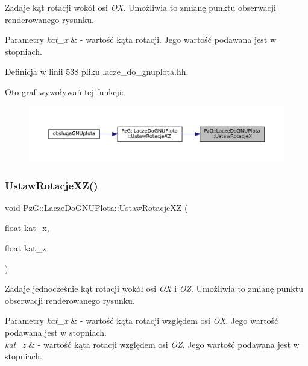 Zadaje kąt rotacji wokół osi {\itshape OX}. Umożliwia to zmianę punktu obserwacji renderowanego rysunku. 
\begin{DoxyParams}{Parametry}
{\em kat\+\_\+x} & -\/ wartość kąta rotacji. Jego wartość podawana jest w stopniach. \\
\hline
\end{DoxyParams}


Definicja w linii 538 pliku lacze\+\_\+do\+\_\+gnuplota.\+hh.

Oto graf wywoływań tej funkcji\+:\nopagebreak
\begin{figure}[H]
\begin{center}
\leavevmode
\includegraphics[width=350pt]{class_pz_g_1_1_lacze_do_g_n_u_plota_a88324c53a70846fb6bc9d918ce21fd56_icgraph}
\end{center}
\end{figure}
\mbox{\label{class_pz_g_1_1_lacze_do_g_n_u_plota_a94d8527fd78048ed6cb32ffb29e5f903}} 
\subsubsection{\texorpdfstring{UstawRotacjeXZ()}{UstawRotacjeXZ()}}
{\footnotesize\ttfamily void Pz\+G\+::\+Lacze\+Do\+G\+N\+U\+Plota\+::\+Ustaw\+Rotacje\+XZ (\begin{DoxyParamCaption}\item[{float}]{kat\+\_\+x,  }\item[{float}]{kat\+\_\+z }\end{DoxyParamCaption})\hspace{0.3cm}{\ttfamily [inline]}}

Zadaje jednocześnie kąt rotacji wokół osi {\itshape OX} i {\itshape OZ}. Umożliwia to zmianę punktu obserwacji renderowanego rysunku. 
\begin{DoxyParams}{Parametry}
{\em kat\+\_\+x} & -\/ wartość kąta rotacji względem osi {\itshape OX}. Jego wartość podawana jest w stopniach. \\
\hline
{\em kat\+\_\+z} & -\/ wartość kąta rotacji względem osi {\itshape OZ}. Jego wartość podawana jest w stopniach. \\
\hline
\end{DoxyParams}



